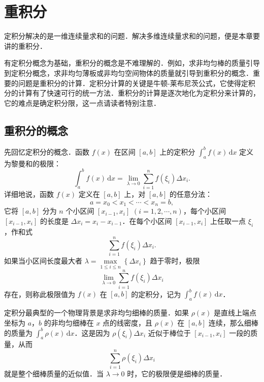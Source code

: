 \chapter{重积分}

定积分解决的是一维连续量求和的问题．解决多维连续量求和的问题，便是本章要讲的重积分．

有定积分概念为基础，重积分的概念是不难理解的．例如，求非均匀棒的质量引导到定积分概念，求非均匀薄板或非均匀空间物体的质量就引导到重积分的概念．重要的问题是重积分的计算．定积分计算的关键是牛顿-莱布尼茨公式，它使得定积分的计算有了快速可行的统一方法．重积分的计算是逐次地化为定积分来计算的，它的难点是确定积分限，这一点请读者特别注意．

\section{重积分的概念}\label{sec:20-1}

先回忆定积分的概念．函数 $f(x)$ 在区间 $[a,b]$ 上的定积分 $\displaystyle\int_{a}^{b}f(x)\,\mathrm{d}x$ 定义为黎曼和的极限：
\[
\int_{a}^{b}f(x)\,\mathrm{d}x=\lim_{\lambda\to 0}\sum_{i=1}^{n}f(\xi_{i})\Delta x_{i}.
\]
详细地说，函数 $f(x)$ 定义在 $[a,b]$ 上，对 $[a,b]$ 的任意分法：
\[
a=x_{0}<x_{1}<\cdots<x_{n}=b,
\]
它将 $[a,b]$ 分为 $n$ 个小区间 $[x_{i-1},x_{i}]$ $(i=1,2,\cdots,n)$，每个小区间 $[x_{i-1},x_{i}]$ 的长度是 $\Delta x_{i}=x_{i}-x_{i-1}$．在每个小区间 $[x_{i-1},x_{i}]$ 上任取一点 $\xi_{i}$，作和式
\[
\sum_{i=1}^{n}f(\xi_{i})\Delta x_{i}.
\]
如果当小区间长度最大者 $\lambda=\max\limits_{1\leqslant i\leqslant n}\left\{\Delta x_{i}\right\}$ 趋于零时，极限
\[
\lim_{\lambda\to 0}\sum_{i=1}^{n}f(\xi_{i})\Delta x_{i}
\]
存在，则称此极限值为 $f(x)$ 在 $[a,b]$ 的定积分，记为 $\displaystyle\int_{a}^{b}f(x)\,\mathrm{d}x$．

定积分最典型的一个物理背景是求非均匀细棒的质量．如果 $\rho(x)$ 是直线上端点坐标为 $a$，$b$ 的非均匀细棒在 $x$ 点的线密度，且 $\rho(x)$ 在 $[a,b]$ 连续，那么细棒的质量为 $\displaystyle\int_{a}^{b}\rho(x)\,\mathrm{d}x$．这是因为 $\rho(\xi_{i})\Delta x_{i}$ 近似于棒位于 $[x_{i-1},x_{i}]$ 一段的质量，从而
\[
\sum_{i=1}^{n}\rho(\xi_{i})\Delta x_{i}
\]
就是整个细棒质量的近似值．当 $\lambda\to 0$ 时，它的极限便是细棒的质量．

